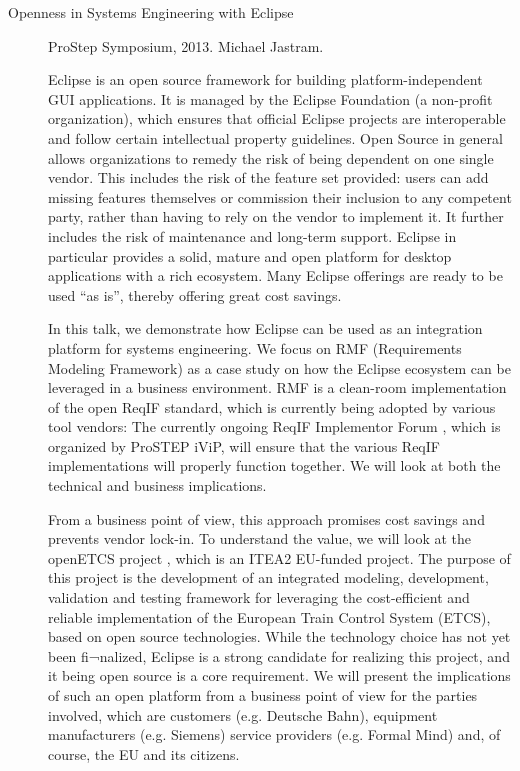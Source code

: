 \begin{description}
\item[Openness in Systems Engineering with Eclipse] ProStep Symposium, 2013. Michael Jastram.

Eclipse is an open source framework for building platform-independent GUI applications. It is managed by the Eclipse Foundation (a non-profit organization), which ensures that official Eclipse projects are interoperable and follow certain intellectual property guidelines. Open Source in general allows organizations to remedy the risk of being dependent on one single vendor. This includes the risk of the feature set provided: users can add missing features themselves or commission their inclusion to any competent party, rather than having to rely on the vendor to implement it. It further includes the risk of maintenance and long-term support. Eclipse in particular provides a solid, mature and open platform for desktop applications with a rich ecosystem. Many Eclipse offerings are ready to be used “as is”, thereby offering great cost savings.

In this talk, we demonstrate how Eclipse can be used as an integration platform for systems engineering. We focus on RMF (Requirements Modeling Framework) as a case study on how the Eclipse ecosystem can be leveraged in a business environment. RMF is a clean-room implementation of the open ReqIF standard, which is currently being adopted by various tool vendors: The currently ongoing ReqIF Implementor Forum , which is organized by ProSTEP iViP, will ensure that the various ReqIF implementations will properly function together. We will look at both the technical and business implications.

From a business point of view, this approach promises cost savings and prevents vendor lock-in. To understand the value, we will look at the openETCS project , which is an ITEA2 EU-funded project. The purpose of this project is the development of an integrated modeling, development, validation and testing framework for leveraging the cost-efficient and reliable implementation of the European Train Control System (ETCS), based on open source technologies. While the technology choice has not yet been fi¬nalized, Eclipse is a strong candidate for realizing this project, and it being open source is a core requirement. We will present the implications of such an open platform from a business point of view for the parties involved, which are customers (e.g. Deutsche Bahn), equipment manufacturers (e.g. Siemens) service providers (e.g. Formal Mind) and, of course, the EU and its citizens.


\end{description}
